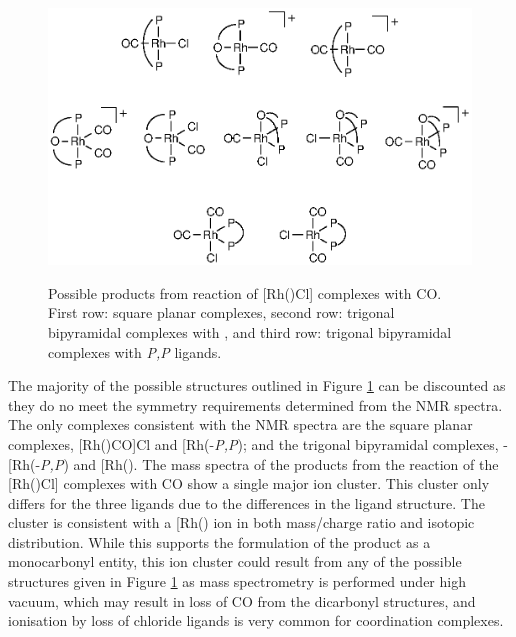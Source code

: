 \begin{figure}[htb]
\begin{center}
\vspace{0.5cm}
\includegraphics{../Figures/RhCOpossibilities.eps}
\caption[Possible products from reaction of \texorpdfstring{[Rh(\tBuxantphosk)Cl{]} complexes with CO} R]{Possible products from reaction of \texorpdfstring{[Rh(\tBuxantphosk)Cl] complexes with CO} R.  First row: square planar complexes, second row: trigonal bipyramidal complexes with \POP{} \tBuxantphos{}, and third row: trigonal bipyramidal complexes with \dento{}\emph{P,P}\textprime{} \tBuxantphos{} ligands.}
\vspace{0.2cm}
\label{RhCOpossibilities}
\end{center}
\end{figure}
\vspace{0.2cm}

The majority of the possible structures outlined in Figure \ref{RhCOpossibilities} can be discounted as they do no meet the symmetry requirements determined from the NMR spectra.  The only complexes consistent with the NMR spectra are the square planar complexes, [Rh(\tBuxantphosk)CO]Cl and [Rh(\tBuxantphos-\dento{}\emph{P,P}\textprime)\ce{(CO)2]Cl}; and the trigonal bipyramidal complexes, \trans-[Rh(\tBuxantphos-\dento{}\emph{P,P}\textprime)\ce{(CO)2Cl]} and [Rh(\tBuxantphosk)\ce{(CO)2]+}.  The mass spectra of the products from the reaction of the [Rh(\tBuxantphos)Cl] complexes with CO show a single major ion cluster.  This cluster only differs for the three ligands due to the differences in the ligand structure.  The cluster is consistent with a [Rh(\tBuxantphos)\ce{(CO)]+} ion in both mass/charge ratio and isotopic distribution.  While this supports the formulation of the product as a monocarbonyl entity, this ion cluster could result from any of the possible structures given in Figure \ref{RhCOpossibilities} as mass spectrometry is performed under high vacuum, which may result in loss of CO from the dicarbonyl structures, and ionisation by loss of chloride ligands is very common for coordination complexes.\cite{Henderson1998}

